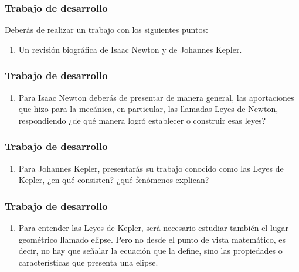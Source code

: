 \documentclass[14pt]{beamer}
\begin{document}
\begin{frame}
\frametitle{Trabajo de desarrollo}
Deberás de realizar un trabajo con los siguientes puntos:
\pause
{}
\begin{enumerate}[<+->]
\item Un revisión biográfica de Isaac Newton y de Johannes Kepler.
\seti
\end{enumerate}
\end{frame}
\begin{frame}
\frametitle{Trabajo de desarrollo}
\begin{enumerate}[<+->]
\conti
\item Para Isaac Newton deberás de presentar de manera general, las aportaciones que hizo para la mecánica, en particular, las llamadas Leyes de Newton, respondiendo ¿de qué manera logró establecer o construir esas leyes?
\seti
\end{enumerate}
\end{frame}
\begin{frame}
\frametitle{Trabajo de desarrollo}
\begin{enumerate}[<+->]
\conti
\item Para Johannes Kepler, presentarás su trabajo conocido como las Leyes de Kepler, ¿en qué consisten? ¿qué fenómenos explican?
\seti
\end{enumerate}
\end{frame}
\begin{frame}
\frametitle{Trabajo de desarrollo}
\begin{enumerate}[<+->]
\conti
\item Para entender las Leyes de Kepler, será necesario estudiar también el lugar geométrico llamado elipse. Pero no desde el punto de vista matemático, es decir, no hay que señalar la ecuación que la define, sino las propiedades o características que presenta una elipse.
\seti
\end{enumerate}
\end{frame}
\end{document}
